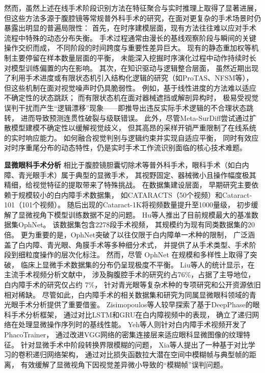 然而，虽然上述在线手术阶段识别方法在特征聚合与实时推理上取得了显著进展，
但这些方法多源于腹腔镜等常规普外科手术的研究，在面对更复杂的手术场景时仍暴露出明显的普遍局限性：
首先，在时序建模层面，现有方法往往难以应对手术流程中特殊的动态分布失衡。
手术过程通常由漫长的基线观察阶段与瞬间的关键操作交织而成，
不同阶段的时间跨度与重要性差异巨大。
现有的静态重加权等机制主要停留在样本数量层面的平衡，
未能深入挖掘时序演化过程中动作持续时长对模型训练偏置的内在影响。
其次，在知识驱动与逻辑整合层面，
虽然近期出现了利用手术进度或有限状态机引入结构化逻辑的研究（如ProTAS、NFSM等），
但这些机制在面对视觉噪声时仍具脆弱性。
例如，基于线性进度的方法难以适应不确定性的状态跳跃；
而有限状态机在面对器械遮挡或解剖异构时，
极易受视觉误判干扰而产生“逻辑漂移”现象——即推导出违反实际手术逻辑的不合理状态跳转，
进而导致预测连贯性破裂与级联错误。
此外，尽管Meta-SurDiff尝试通过扩散模型建模不确定性以缓解视觉歧义，
但其高昂的采样开销严重限制了在线系统的实时响应能力。
如何融合视觉判别与逻辑约束并实现自适应平衡，
同时有效应对时序重尾分布的动态特性，仍是实时手术工作流识别面临的核心技术难题。

\textbf{显微眼科手术分析}\quad
相比于腹腔镜胆囊切除术等普外科手术，眼科手术（如白内障、青光眼手术）属于典型的显微手术，
其视野固定、器械微小且操作幅度极其精细，给视觉特征的提取带来了特殊挑战。
在数据集建设层面，
早期研究主要依赖于规模较小的白内障手术数据集，
如CATARACTS\cite{ghamsarian2021relevance}（50个视频）和Cataract-101\cite{schoeffmann2018cataract}（101个视频）。
随后出现的Cataract-1K\cite{ghamsarian2023cataract}将视频数量提升至1000量级，
初步缓解了显微视角下模型训练数据不足的问题。
Hu等人\cite{hu2024ophnet}推出了目前规模最大的基准数据集OphNet。
该数据集包含2278段手术视频，
其规模约为现有同类数据集的20倍。
更为重要的是，OphNet突破了以往仅限于白内障单一术种的限制，
广泛涵盖了白内障、青光眼、角膜手术等多种细分术式，
并提供了从手术类型、手术阶段到细粒度操作的层次化标注。
然而，尽管 OphNet 在规模和多样性上取得了突破，
临床上显微手术数据集的分布仍呈现极度不平衡。
Liu等人\cite{liu2025deep}的统计显示，在主流手术视频分析文献中，
涉及胸腹腔手术的研究约占76\%，占据了主导地位，白内障手术的研究仅占约 7\%，
针对青光眼等复杂术种的专项研究和公开资源依旧相对稀缺。
尽管如此，白内障手术的相关数据集和研究为同属显微眼科领域的青光眼手术分析提供了重要借鉴。
Zisimopoulos等人\cite{zisimopoulos2018deepphase}较早探索了基于DeepPhase的眼科手术分析框架，
通过对比LSTM和GRU在白内障视频中的表现，
确立了递归网络在处理显微操作序列时的基线性能。
Yeh等人\cite{yeh2021phacotrainer}则针对白内障手术视频开发了PhacoTrainer，
通过改进VGG网络的密集连接层来适应眼科显微图像的纹理特征。
针对显微手术中阶段转换界限模糊的问题，
Xia等人\cite{xia2021against}提出了一种基于对比学习的卷积递归网络架构，
通过对比损失函数拉大潜在空间中模糊帧与典型帧的距离，
有效缓解了显微视角下因视觉差异微小导致的“模糊帧”误判问题。

